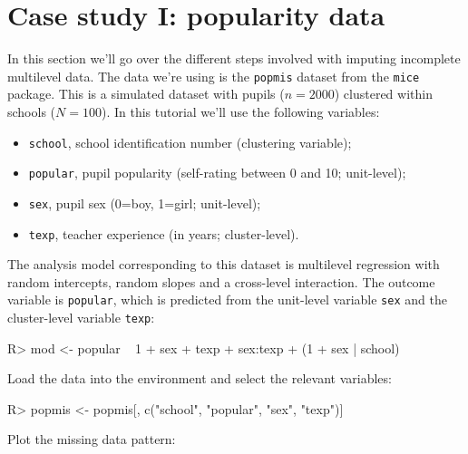 \documentclass[
]{jss}
\providecommand{\tightlist}{%
  \setlength{\itemsep}{0pt}\setlength{\parskip}{0pt}}
\begin{document}
\hypertarget{case-study-i-popularity-data}{%
\section{Case study I: popularity
data}\label{case-study-i-popularity-data}}

In this section we'll go over the different steps involved with imputing
incomplete multilevel data. The data we're using is the \texttt{popmis}
dataset from the \texttt{mice} package. This is a simulated dataset with
pupils (\(n = 2000\)) clustered within schools (\(N = 100\)). In this
tutorial we'll use the following variables:

\begin{itemize}
\tightlist
\item
  \texttt{school}, school identification number (clustering variable);
\item
  \texttt{popular}, pupil popularity (self-rating between 0 and 10;
  unit-level);
\item
  \texttt{sex}, pupil sex (0=boy, 1=girl; unit-level);
\item
  \texttt{texp}, teacher experience (in years; cluster-level).
\end{itemize}

The analysis model corresponding to this dataset is multilevel
regression with random intercepts, random slopes and a cross-level
interaction. The outcome variable is \texttt{popular}, which is
predicted from the unit-level variable \texttt{sex} and the
cluster-level variable \texttt{texp}:

\begin{CodeChunk}
\begin{CodeInput}
R> mod <- popular ~ 1 + sex + texp + sex:texp + (1 + sex | school)
\end{CodeInput}
\end{CodeChunk}

Load the data into the environment and select the relevant variables:

\begin{CodeChunk}
\begin{CodeInput}
R> popmis <- popmis[, c("school", "popular", "sex", "texp")] 
\end{CodeInput}
\end{CodeChunk}

Plot the missing data pattern:
\end{document}
